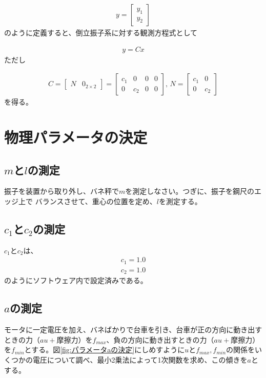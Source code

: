 \documentclass[a4j,11pt,twoside]{ujbook}
\begin{document}
\begin{eqnarray}
	y = \left[
	\begin{array}{c}
		y_1\\
		y_2
	\end{array}
	\right]
\end{eqnarray}
のように定義すると、倒立振子系に対する観測方程式として

\begin{eqnarray}
	y = Cx
\end{eqnarray}
ただし

\begin{eqnarray}
C = \left[
\begin{array}{cc}
N & 0_{2×2}
\end{array}
\right] = \left[
\begin{array}{cccc}
c_1 &  0  & 0 & 0\\
0  & c_2 & 0 & 0
\end{array}
\right],\,
N = \left[
\begin{array}{cc}
c_1 &  0 \\
0  & c_2
\end{array}
\right]
\label{eq:C,N}
\end{eqnarray}
を得る。

\section{物理パラメータの決定}
\subsection{$m$と$l$の測定}
振子を装置から取り外し、バネ秤で$m$を測定しなさい。つぎに、振子を鋼尺のエッジ上で
バランスさせて、重心の位置を定め、$l$を測定する。

\subsection{$c_1$と$c_2$の測定}
$c_1$と$c_2$は、
\begin{eqnarray}
	c_1 = 1.0\\
	c_2 = 1.0
\end{eqnarray}
のようにソフトウェア内で設定済みである。

\subsection{$a$の測定}
モータに一定電圧を加え、バネばかりで台車を引き、台車が正の方向に動き出すときの力（$au+摩擦力$）を$f_{max}$、負の方向に動き出すときの力（$au+摩擦力$）を$f_{min}$とする。図\ref{fig:パラメータaの決定}にしめすように$u$と$f_{max},f_{min}$の関係をいくつかの電圧について調べ、最小2乗法によって1次関数を求め、この傾きを$a$とする。
\end{document}
